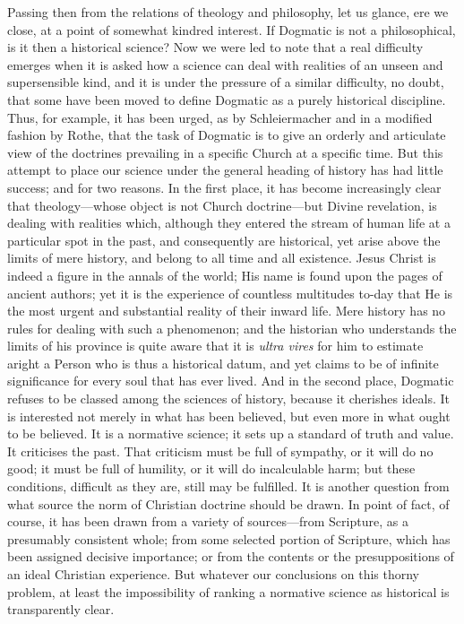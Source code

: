 \documentclass[12pt,a5paper]{article}
\begin{document}
Passing then from the relations of theology and philosophy,
let us glance, ere we close, at a point of somewhat kindred
interest. If Dogmatic is not a philosophical, is it then
a historical science? Now we were led to note that a
real difficulty emerges when it is asked how a science can
deal with realities of an unseen and supersensible kind,
and it is under the pressure of a similar difficulty, no doubt,
that some have been moved to define Dogmatic as a purely
historical discipline. Thus, for example, it has been urged,
as by Schleiermacher and in a modified fashion by Rothe,
that the task of Dogmatic is to give an orderly and articulate
view of the doctrines prevailing in a specific Church
at a specific time. But this attempt to place our science
under the general heading of history has had little success;
and for two reasons. In the first place, it has become increasingly
clear that theology---whose object is not Church
doctrine---but Divine revelation, is dealing with realities
which, although they entered the stream of human life at a
particular spot in the past, and consequently are historical,
yet arise above the limits of mere history, and belong to all
time and all existence. Jesus Christ is indeed a figure in
the annals of the world; His name is found upon the pages
of ancient authors; yet it is the experience of countless
multitudes to-day that He is the most urgent and substantial
reality of their inward life. Mere history has no rules
for dealing with such a phenomenon; and the historian who
understands the limits of his province is quite aware that
it is \textit{ultra vires} for him to estimate aright a Person who
is thus a historical datum, and yet claims to be of infinite
significance for every soul that has ever lived. And in the
second place, Dogmatic refuses to be classed among the
sciences of history, because it cherishes ideals. It is interested
not merely in what has been believed, but even
more in what ought to be believed. It is a normative
science; it sets up a standard of truth and value. It
criticises the past. That criticism must be full of sympathy,
or it will do no good; it must be full of humility, or it will
do incalculable harm; but these conditions, difficult as
they are, still may be fulfilled. It is another question from
what source the norm of Christian doctrine should be
drawn. In point of fact, of course, it has been drawn from
a variety of sources---from Scripture, as a presumably consistent
whole; from some selected portion of Scripture,
which has been assigned decisive importance; or from the
contents or the presuppositions of an ideal Christian experience.
But whatever our conclusions on this thorny
problem, at least the impossibility of ranking a normative
science as historical is transparently clear.
\end{document}
